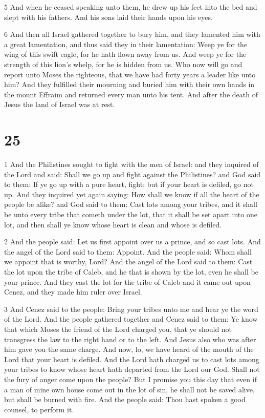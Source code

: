 \par 5 And when he ceased speaking unto them, he drew up his feet into the bed and slept with his fathers. And his sons laid their hands upon his eyes.

\par 6 And then all Israel gathered together to bury him, and they lamented him with a great lamentation, and thus said they in their lamentation: Weep ye for the wing of this swift eagle, for he hath flown away from us. And weep ye for the strength of this lion's whelp, for he is hidden from us. Who now will go and report unto Moses the righteous, that we have had forty years a leader like unto him? And they fulfilled their mourning and buried him with their own hands in the mount Effraim and returned every man unto his tent. And after the death of Jesus the land of Israel was at rest.

\chapter{25}

\par 1 And the Philistines sought to fight with the men of Israel: and they inquired of the Lord and said: Shall we go up and fight against the Philistines? and God said to them: If ye go up with a pure heart, fight; but if your heart is defiled, go not up. And they inquired yet again saying: How shall we know if all the heart of the people be alike? and God said to them: Cast lots among your tribes, and it shall be unto every tribe that cometh under the lot, that it shall be set apart into one lot, and then shall ye know whose heart is clean and whose is defiled. 

\par 2 And the people said: Let us first appoint over us a prince, and so cast lots. And the angel of the Lord said to them: Appoint. And the people said: Whom shall we appoint that is worthy, Lord? And the angel of the Lord said to them: Cast the lot upon the tribe of Caleb, and he that is shown by the lot, even he shall be your prince. And they cast the lot for the tribe of Caleb and it came out upon Cenez, and they made him ruler over Israel. 

\par 3 And Cenez said to the people: Bring your tribes unto me and hear ye the word of the Lord. And the people gathered together and Cenez said to them: Ye know that which Moses the friend of the Lord charged you, that ye should not transgress the law to the right hand or to the left. And Jesus also who was after him gave you the same charge. And now, lo, we have heard of the mouth of the Lord that your heart is defiled. And the Lord hath charged us to cast lots among your tribes to know whose heart hath departed from the Lord our God. Shall not the fury of anger come upon the people? But I promise you this day that even if a man of mine own house come out in the lot of sin, he shall not be saved alive, but shall be burned with fire. And the people said: Thou hast spoken a good counsel, to perform it.

